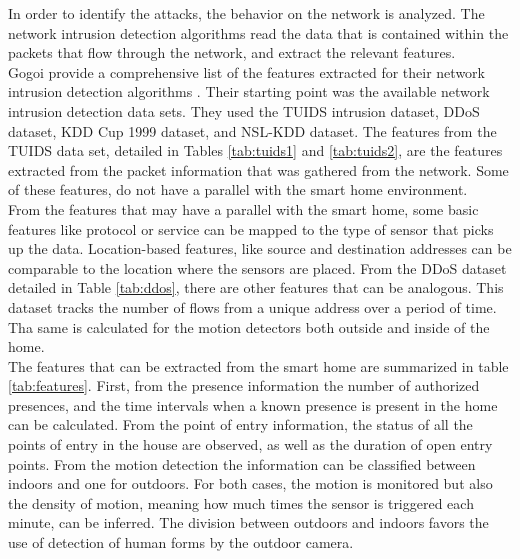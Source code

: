 In order to identify the attacks, the behavior on the network is analyzed. The network intrusion detection algorithms read the data that is contained within the packets that flow through the network, and extract the relevant features.\\ 
Gogoi \etAl provide a comprehensive list of the features extracted for their network intrusion detection algorithms \cite{Gogoi01042014}. Their starting point was the available network intrusion detection data sets. They used the TUIDS intrusion dataset, DDoS dataset, KDD Cup 1999 dataset, and NSL-KDD dataset. The features from the TUIDS data set, detailed in Tables \ref{tab:tuids1} and \ref{tab:tuids2}, are the features extracted from the packet information that was gathered from the network. Some of these features, do not have a parallel with the smart home environment.\\
From the features that may have a parallel with the smart home, some basic features like protocol or service can be mapped to the type of sensor that picks up the data. Location-based features, like source and destination addresses can be comparable to the location where the sensors are placed. From the DDoS dataset detailed in Table \ref{tab:ddos}, there are other features that can be analogous. This dataset tracks the number  of flows from a unique address over a period of time. Tha same is calculated for the motion detectors both outside and inside of the home. \\

The features that can be extracted from the smart home are summarized in table \ref{tab:features}. First, from the presence information the number of authorized presences, and the time intervals when a known presence is present in the home can be calculated. From the point of entry information, the status of all the points of entry in the house are observed, as well as the duration of open entry points. From the motion detection the information can be classified between indoors and one for outdoors. For both cases, the motion is monitored but also the density of motion, meaning how much times the sensor is triggered each minute, can be inferred. The division between outdoors and indoors favors the use of detection of human forms by the outdoor camera.


